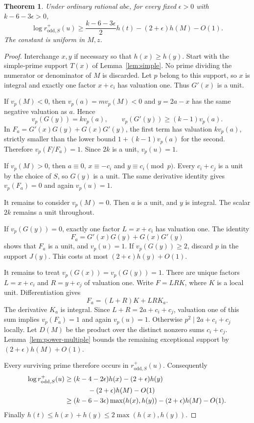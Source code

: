 \documentclass[11pt,a4paper]{article}
\newtheorem{theorem}{Theorem}[section]
\begin{document}
\begin{theorem}\label{thm:derivative-height}
Under ordinary rational $abc$, for every fixed $\epsilon>0$ with
$k-6-3\epsilon>0$,
\begin{equation}\label{eq:derivative-height}
 \log r^+_{\mathrm{odd},S}(u)
 \ge \frac{k-6-3\epsilon}{2}h(t)
                  -(2+\epsilon)h(M)-O(1).
\end{equation}
The constant is uniform in $M,z$.
\end{theorem}
\begin{proof}
Interchange $x,y$ if necessary so that $h(x)\ge h(y)$.
Start with the simple-prime support $T(x)$ of Lemma~\ref{lem:simple}.
No prime dividing the numerator or denominator of $M$ is discarded.
Let $p$ belong to this support, so $x$ is integral and exactly one
factor $x+c_i$ has valuation one. Thus $G'(x)$ is a unit.

If $v_p(M)<0$, then $v_p(a)=m v_p(M)<0$ and
$y=2a-x$ has the same negative valuation as $a$. Hence
\[
 v_p(G(y))=k v_p(a),\qquad
 v_p(G'(y))\ge(k-1)v_p(a).
\]
In $F_a=G'(x)G(y)+G(x)G'(y)$, the first term has valuation
$k v_p(a)$, strictly smaller than the lower bound
$1+(k-1)v_p(a)$ for the second. Therefore $v_p(F/F_a)=1$.
Since $2k$ is a unit, $v_p(u)=1$.

If $v_p(M)>0$, then $a\equiv0$, $x\equiv-c_i$ and
$y\equiv c_i\pmod p$. Every $c_i+c_j$ is a unit by the
choice of $S$, so $G(y)$ is a unit. The same derivative identity
gives $v_p(F_a)=0$ and again $v_p(u)=1$.

It remains to consider $v_p(M)=0$. Then $a$ is a unit, and $y$
is integral. The scalar $2k$ remains a unit throughout.

If $v_p(G(y))=0$, exactly one factor $L=x+c_i$ has valuation one.
The identity
\[
                         F_a=G'(x)G(y)+G(x)G'(y)
\]
shows that $F_a$ is a unit, and $v_p(u)=1$.
If $v_p(G(y))\ge2$, discard $p$ in the support $J(y)$.
This costs at most $(2+\epsilon)h(y)+O(1)$.

It remains to treat $v_p(G(x))=v_p(G(y))=1$.
There are unique factors $L=x+c_i$ and $R=y+c_j$ of valuation one.
Write $F=LRK$, where $K$ is a local unit. Differentiation gives
\[
                       F_a=(L+R)K+LRK_a.
\]
The derivative $K_a$ is integral. Since
$L+R=2a+c_i+c_j$, valuation one of this sum implies
$v_p(F_a)=1$ and again $v_p(u)=1$.
Otherwise $p^2\mid 2a+c_i+c_j$ locally.
Let $D(M)$ be the product over the distinct nonzero sums $c_i+c_j$.
Lemma~\ref{lem:power-multiple} bounds the remaining exceptional
support by $(2+\epsilon)h(M)+O(1)$.

Every surviving prime therefore occurs in
$r^+_{\mathrm{odd},S}(u)$. Consequently
\begin{align*}
 \log r^+_{\mathrm{odd},S}(u)
 &\ge(k-4-2\epsilon)h(x)-(2+\epsilon)h(y)\\
 &\hspace{12mm}-(2+\epsilon)h(M)-O(1)\\
 &\ge(k-6-3\epsilon)\max(h(x),h(y))
                  -(2+\epsilon)h(M)-O(1).
\end{align*}
Finally $h(t)\le h(x)+h(y)\le2\max(h(x),h(y))$.
\end{proof}
\end{document}
